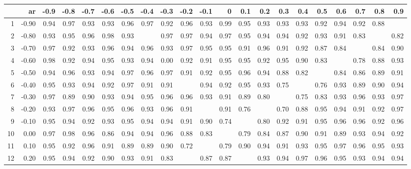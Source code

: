 \begin{table}[ht]
\centering
\begin{tabular}{rrrrrrrrrrrrrrrrrrrrr}
  \hline
 & ar & -0.9 & -0.8 & -0.7 & -0.6 & -0.5 & -0.4 & -0.3 & -0.2 & -0.1 & 0 & 0.1 & 0.2 & 0.3 & 0.4 & 0.5 & 0.6 & 0.7 & 0.8 & 0.9 \\ 
  \hline
1 & -0.90 & 0.94 & 0.97 & 0.93 & 0.93 & 0.96 & 0.97 & 0.92 & 0.96 & 0.93 & 0.99 & 0.95 & 0.93 & 0.93 & 0.93 & 0.92 & 0.94 & 0.92 & 0.88 &  \\ 
  2 & -0.80 & 0.93 & 0.95 & 0.96 & 0.98 & 0.93 &  & 0.97 & 0.97 & 0.94 & 0.97 & 0.95 & 0.94 & 0.94 & 0.92 & 0.93 & 0.91 & 0.83 &  & 0.82 \\ 
  3 & -0.70 & 0.97 & 0.92 & 0.93 & 0.96 & 0.94 & 0.96 & 0.93 & 0.97 & 0.95 & 0.95 & 0.91 & 0.96 & 0.91 & 0.92 & 0.87 & 0.84 &  & 0.84 & 0.90 \\ 
  4 & -0.60 & 0.98 & 0.92 & 0.94 & 0.95 & 0.93 & 0.94 & 0.00 & 0.92 & 0.91 & 0.95 & 0.95 & 0.92 & 0.95 & 0.90 & 0.83 &  & 0.78 & 0.88 & 0.93 \\ 
  5 & -0.50 & 0.94 & 0.96 & 0.93 & 0.94 & 0.97 & 0.96 & 0.97 & 0.91 & 0.92 & 0.95 & 0.96 & 0.94 & 0.88 & 0.82 &  & 0.84 & 0.86 & 0.89 & 0.91 \\ 
  6 & -0.40 & 0.95 & 0.93 & 0.94 & 0.92 & 0.97 & 0.91 & 0.91 &  & 0.94 & 0.92 & 0.95 & 0.93 & 0.75 &  & 0.76 & 0.93 & 0.89 & 0.90 & 0.94 \\ 
  7 & -0.30 & 0.97 & 0.89 & 0.90 & 0.93 & 0.94 & 0.95 & 0.96 & 0.96 & 0.93 & 0.91 & 0.89 & 0.80 &  & 0.75 & 0.83 & 0.93 & 0.96 & 0.93 & 0.97 \\ 
  8 & -0.20 & 0.93 & 0.97 & 0.96 & 0.95 & 0.96 & 0.93 & 0.96 & 0.91 &  & 0.91 & 0.76 &  & 0.70 & 0.88 & 0.95 & 0.94 & 0.91 & 0.92 & 0.97 \\ 
  9 & -0.10 & 0.95 & 0.94 & 0.92 & 0.93 & 0.95 & 0.94 & 0.94 & 0.91 & 0.90 & 0.74 &  & 0.80 & 0.92 & 0.91 & 0.95 & 0.96 & 0.96 & 0.92 & 0.96 \\ 
  10 & 0.00 & 0.97 & 0.98 & 0.96 & 0.86 & 0.94 & 0.94 & 0.96 & 0.88 & 0.83 &  & 0.79 & 0.84 & 0.87 & 0.90 & 0.91 & 0.89 & 0.93 & 0.94 & 0.92 \\ 
  11 & 0.10 & 0.95 & 0.92 & 0.96 & 0.91 & 0.89 & 0.89 & 0.90 & 0.72 &  & 0.79 & 0.90 & 0.94 & 0.91 & 0.93 & 0.95 & 0.97 & 0.96 & 0.95 & 0.93 \\ 
  12 & 0.20 & 0.95 & 0.94 & 0.92 & 0.90 & 0.93 & 0.91 & 0.83 &  & 0.87 & 0.87 &  & 0.93 & 0.94 & 0.97 & 0.96 & 0.95 & 0.93 & 0.94 & 0.94 \\ 

\end{tabular}
\end{table}
